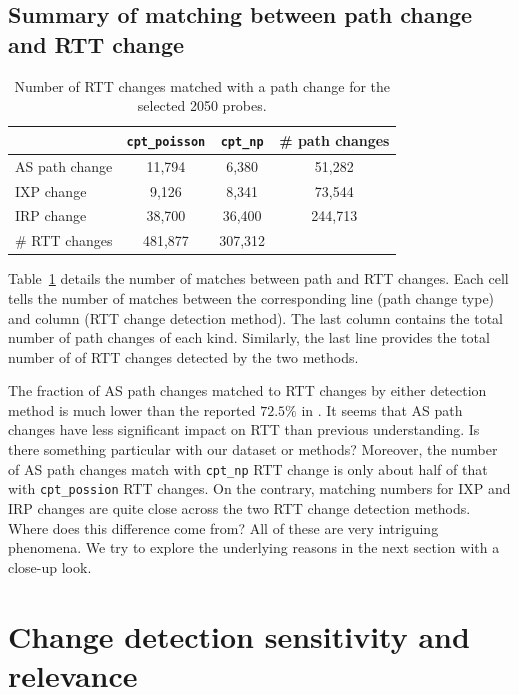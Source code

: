 \subsection{Summary of matching between path change and RTT change}

\begin{table}[!htb]
\caption{Number of RTT changes matched with a path change for the selected 2050 probes.}
\label{tab:corr_overview}
\centering
\footnotesize
\setlength{\tabcolsep}{0.5em}
\begin{tabular}{l|cc|c}
\toprule
& \texttt{cpt\_poisson} & \texttt{cpt\_np} & \# path changes\\
\midrule
AS path change & 11,794 & 6,380 & 51,282 \\
IXP change & 9,126 & 8,341 & 73,544\\
IRP change & 38,700 & 36,400 & 244,713\\
\midrule
\# RTT changes & 481,877 & 307,312 & \\
\bottomrule
\end{tabular}
\end{table}
Table~\ref{tab:corr_overview} details the number of matches between path and RTT changes.
Each cell tells the number of matches between the corresponding line (path change type) and column (RTT change detection method).
The last column contains the total number of path changes of each kind.
Similarly, the last line provides the total number of of RTT changes detected by the two methods.

The fraction of AS path changes matched to RTT changes by either detection method is much lower than the reported $72.5\%$ in \cite{Rimondini2014}.
It seems that AS path changes have less significant impact on RTT than previous understanding.
Is there something particular with our dataset or methods?
Moreover, the number of AS path changes match with \texttt{cpt\_np} RTT change is only about half of that with \texttt{cpt\_possion} RTT changes.
On the contrary, matching numbers for IXP and \ac{IRP} changes are quite close across the two RTT change detection methods.
Where does this difference come from?
All of these are very intriguing phenomena.
We try to explore the underlying reasons in the next section with a close-up look.

\section{Change detection sensitivity and relevance}

